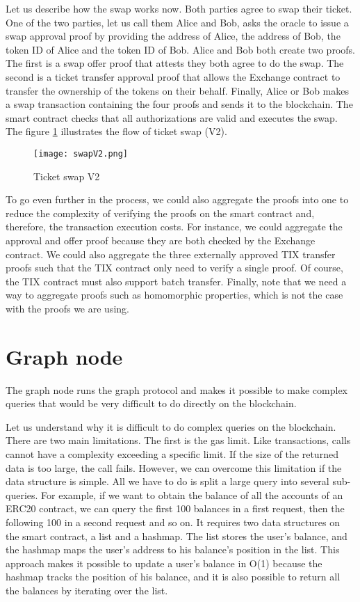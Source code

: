 \documentclass[a4paper,11pt,oneside]{report}
\begin{document}
Let us describe how the swap works now. Both parties agree to swap their ticket. One of the two parties, let us call them Alice and Bob, asks the oracle to issue a swap approval proof by providing the address of Alice, the address of Bob, the token ID of Alice and the token ID of Bob. Alice and Bob both create two proofs. The first is a swap offer proof that attests they both agree to do the swap. The second is a ticket transfer approval proof that allows the Exchange contract to transfer the ownership of the tokens on their behalf. Finally, Alice or Bob makes a swap transaction containing the four proofs and sends it to the blockchain. The smart contract checks that all authorizations are valid and executes the swap. The figure \hyperref[fig:swapV2]{ \ref{fig:swapV2}} illustrates the flow of ticket swap (V2).

\begin{figure}[h!] 
  \centering
  \texttt{[image: swapV2.png]}
  \caption{Ticket swap V2}
  \label{fig:swapV2}
\end{figure}

To go even further in the process, we could also aggregate the proofs into one to reduce the complexity of verifying the proofs on the smart contract and, therefore, the transaction execution costs. For instance, we could aggregate the approval and offer proof because they are both checked by the Exchange contract. We could also aggregate the three externally approved TIX transfer proofs such that the TIX contract only need to verify a single proof. Of course, the TIX contract must also support batch transfer. Finally, note that we need a way to aggregate proofs such as homomorphic properties, which is not the case with the proofs we are using.

\section{Graph node}
The graph node runs the graph protocol and makes it possible to make complex queries that would be very difficult to do directly on the blockchain.

Let us understand why it is difficult to do complex queries on the blockchain. There are two main limitations. The first is the gas limit. Like transactions, calls cannot have a complexity exceeding a specific limit. If the size of the returned data is too large, the call fails. However, we can overcome this limitation if the data structure is simple. All we have to do is split a large query into several sub-queries. For example, if we want to obtain the balance of all the accounts of an ERC20 contract, we can query the first 100 balances in a first request, then the following 100 in a second request and so on. It requires two data structures on the smart contract, a list and a hashmap. The list stores the user's balance, and the hashmap maps the user's address to his balance's position in the list. This approach makes it possible to update a user's balance in O(1) because the hashmap tracks the position of his balance, and it is also possible to return all the balances by iterating over the list.
\end{document}
